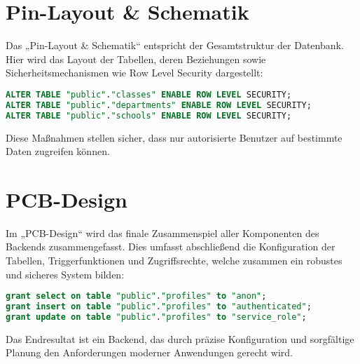 \begin{inhalt}
\section{Pin-Layout \& Schematik}
Das „Pin-Layout \& Schematik“ entspricht der Gesamtstruktur der Datenbank. Hier wird das Layout der Tabellen, deren Beziehungen sowie Sicherheitsmechanismen wie Row Level Security dargestellt:
\begin{lstlisting}[language=SQL, caption=Aktivierung von Row Level Security]
ALTER TABLE "public"."classes" ENABLE ROW LEVEL SECURITY;
ALTER TABLE "public"."departments" ENABLE ROW LEVEL SECURITY;
ALTER TABLE "public"."schools" ENABLE ROW LEVEL SECURITY;
\end{lstlisting}
Diese Maßnahmen stellen sicher, dass nur autorisierte Benutzer auf bestimmte Daten zugreifen können.

\section{PCB-Design}
Im „PCB-Design“ wird das finale Zusammenspiel aller Komponenten des Backends zusammengefasst. Dies umfasst abschließend die Konfiguration der Tabellen, Triggerfunktionen und Zugriffsrechte, welche zusammen ein robustes und sicheres System bilden:
\begin{lstlisting}[language=SQL, caption=Vergabe von Zugriffsrechten]
grant select on table "public"."profiles" to "anon";
grant insert on table "public"."profiles" to "authenticated";
grant update on table "public"."profiles" to "service_role";
\end{lstlisting}
Das Endresultat ist ein Backend, das durch präzise Konfiguration und sorgfältige Planung den Anforderungen moderner Anwendungen gerecht wird.

\end{inhalt}
